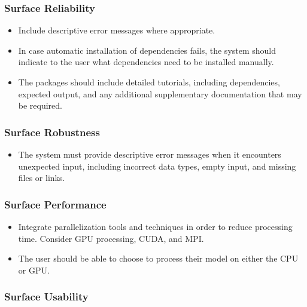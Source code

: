 \documentclass[12pt, notitlepage]{article}
\begin{document}
\subsubsection{Surface Reliability}

\begin{itemize}
	\item Include descriptive error messages where appropriate.
	\item In case automatic installation of dependencies fails, the system should indicate to the user what dependencies need to be installed manually.
	\item The packages should include detailed tutorials, including dependencies, expected output, and any additional supplementary documentation that may be required.
\end{itemize}

\subsubsection{Surface Robustness}

\begin{itemize}
	\item The system must provide descriptive error messages when it encounters unexpected input, including incorrect data types, empty input, and missing files or links.
\end{itemize}

\subsubsection{Surface Performance}

\begin{itemize}
	\item Integrate parallelization tools and techniques in order to reduce processing time. Consider GPU processing, CUDA, and MPI. 
	\item The user should be able to choose to process their model on either the CPU or GPU.
\end{itemize}

\subsubsection{Surface Usability}
\end{document}
